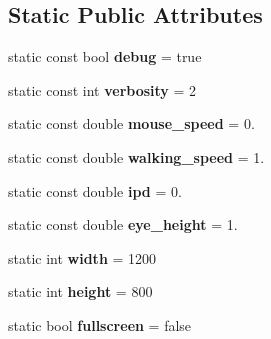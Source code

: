 \subsection*{Static Public Attributes}
\begin{DoxyCompactItemize}
\item 
\hypertarget{class_configuration_a5b9dca2650a0a9e83bc17b5711b3ab3b}{}static const bool {\bfseries debug} = true\label{class_configuration_a5b9dca2650a0a9e83bc17b5711b3ab3b}

\item 
\hypertarget{class_configuration_aacb8860a2d26f4744c2df4b388455ff7}{}static const int {\bfseries verbosity} = 2\label{class_configuration_aacb8860a2d26f4744c2df4b388455ff7}

\item 
\hypertarget{class_configuration_a50ffd47ef2b644f7084231a472796120}{}static const double {\bfseries mouse\+\_\+speed} = 0.\label{class_configuration_a50ffd47ef2b644f7084231a472796120}

\item 
\hypertarget{class_configuration_ac4565a68b0d3e7054bf5a99f322ce2be}{}static const double {\bfseries walking\+\_\+speed} = 1.\label{class_configuration_ac4565a68b0d3e7054bf5a99f322ce2be}

\item 
\hypertarget{class_configuration_a2de3a25dfb76ca3d2431a9450486ca71}{}static const double {\bfseries ipd} = 0.\label{class_configuration_a2de3a25dfb76ca3d2431a9450486ca71}

\item 
\hypertarget{class_configuration_a4ecb752e25704b1671192c040f1cb3ef}{}static const double {\bfseries eye\+\_\+height} = 1.\label{class_configuration_a4ecb752e25704b1671192c040f1cb3ef}

\item 
\hypertarget{class_configuration_ab1f2ea77ed3412150c1c7a38bbadc5fa}{}static int {\bfseries width} = 1200\label{class_configuration_ab1f2ea77ed3412150c1c7a38bbadc5fa}

\item 
\hypertarget{class_configuration_a388ff3895b44add36aa0a9fb9491399a}{}static int {\bfseries height} = 800\label{class_configuration_a388ff3895b44add36aa0a9fb9491399a}

\item 
\hypertarget{class_configuration_a52da4d2795b16decc25178112b065be8}{}static bool {\bfseries fullscreen} = false\label{class_configuration_a52da4d2795b16decc25178112b065be8}


\end{DoxyCompactItemize}
